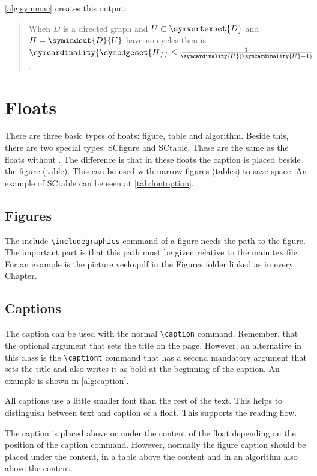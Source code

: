 \autoref{alg:symmac} creates this output:
\begin{quote}
    When $D$ is a directed graph and $U\subset\symvertexset{D}$ and
    $H=\symindsub{D}{U}$ have no cycles then is
    $\symcardinality{\symedgeset{H}}\leq
    \frac{1}{\symcardinality{U}(\symcardinality{U}-1)}$.
\end{quote}

\section{Floats}%
\label{sec:float}

There are three basic types of floats: figure, table and algorithm. Beside
this, there are two special types: SCfigure and SCtable. These are the same as
the floats without . The difference is that in these floats the caption
is placed beside the figure (table). This can be used with narrow figures
(tables) to save space. An example of SCtable can be seen at
\autoref{tab:fontoption}.

\subsection{Figures}

The include \verb!\includegraphics! command of a figure needs the path to the
figure. The important part is that this path must be given relative to the
main.tex file. For an example is the picture veelo.pdf in the Figures folder
linked as  in every Chapter.


\subsection{Captions}%
\label{sub:cap}

The caption can be used with the normal \verb!\caption! command. Remember,
that the optional argument that sets the title on the  page.
However, an alternative in this class is the \verb!\captiont! command that has
a second mandatory argument that sets the title and also writes it as bold at
the beginning of the caption. An example is shown in \autoref{alg:caption}.

All captions use a little smaller font than the rest of the text. This helps
to distinguish between text and caption of a float. This supports the reading
flow.

The caption is placed above or under the content of the float depending on the
position of the caption command. However, normally the figure caption should
be placed under the content, in a table above the content and in an algorithm
also above the content.

